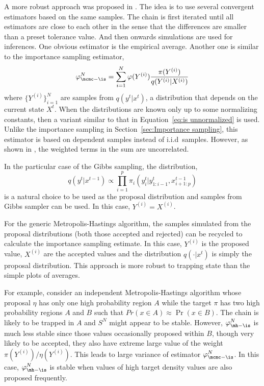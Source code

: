 

A more robust approach was proposed in \cite{Robert:1995ge}. The idea is to
use several convergent estimators based on the same samples. The chain is
first iterated until all estimators are close to each other in the sense that
the differences are smaller than a preset tolerance value. And then onwards
simulations are used for inferences. One obvious estimator is the empirical
average. Another one is similar to the importance sampling estimator,
\begin{equation}
  \varphi_{\mcmc-\is}^N
  = \sum_{i=1}^N \varphi(Y^{(i)})\frac{\pi(Y^{(i)})}{q(Y^{(i)}|X^{(i)})}
  \label{eq:sn is}
\end{equation}
where $\{Y^{(i)}\}_{i=1}^N$ are samples from $q(y^t|x^t)$, a distribution
that depends on the current state $X^t$. When the distributions are known
only up to some normalizing constants, then a variant similar to that in
Equation~\eqref{eq:is unnormalized} is used. Unlike the importance sampling
in Section~\ref{sec:Importance sampling}, this estimator is based on
dependent samples instead of i.i.d\ samples. However, as shown in
\cite[][Lemma~12.11]{Robert:2004tn}, the weighted terms in the sum are
uncorrelated.

In the particular case of the Gibbs sampling, the distribution,
\begin{equation}
  q(y^t|x^{t-1}) \propto
  \prod_{i=1}^p \pi_i(y_i^t|y_{1:i-1}^t,x_{i+1:p}^{t-1})
\end{equation}
is a natural choice to be used as the proposal distribution and samples from
Gibbs sampler can be used. In this case, $Y^{(i)} = X^{(i)}$.

For the generic Metropolis-Hastings algorithm, the samples simulated from the
proposal distributions (both those accepted and rejected) can be recycled to
calculate the importance sampling estimate. In this case, $Y^{(i)}$ is the
proposed value, $X^{(i)}$ are the accepted values and the distribution
$q(\cdot|x^t)$ is simply the proposal distribution. This approach is more
robust to trapping state than the simple plots of averages.

For example, consider an independent Metropolis-Hastings algorithm whose
proposal $\eta$ has only one high probability region $A$ while the target
$\pi$ has two high probability regions $A$ and $B$ such that $Pr(x\in
A)\approx\Pr(x\in B)$. The chain is likely to be trapped in $A$ and $S^N$
might appear to be stable. However, $\varphi_{\mh-\is}^N$ is much less stable
since those values occasionally proposed within $B$, though very likely to be
accepted, they also have extreme large value of the weight
$\pi(Y^{(i)})/\eta(Y^{(i)})$. This leads to large variance of estimator
$\varphi_{\mcmc-\is}^N$. In this case, $\varphi_{\mh-\is}^N$ is stable when
values of high target density values are also proposed frequently.


